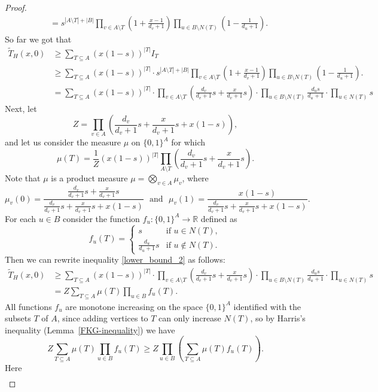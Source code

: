 \documentclass[12pt,a4paper]{amsart}
\numberwithin{equation}{section}
\theoremstyle{plain}
\theoremstyle{definition}
\newcommand{\1}{\textbf{1}}
\begin{document}
\begin{proof}
\begin{align*}
&=s^{|A\setminus T|+|B|}\prod_{v \in A\setminus T}\left(1+\frac{x-1}{d_v+1}\right)\prod_{u\in B\setminus N(T)}\left(1-\frac{1}{d_u+1}\right).
\end{align*}
So far we got that
\begin{align} 
\widetilde{T}_H(x,0)&\geqslant \sum_{T\subseteq A}(x(1-s))^{|T|}I_T \nonumber\\
&\geqslant \sum_{T\subseteq A}(x(1-s))^{|T|}\cdot s^{|A\setminus T|+|B|}\prod_{v \in A\setminus T}\left(1+\frac{x-1}{d_v+1}\right)\prod_{u\in B\setminus N(T)}\left(1-\frac{1}{d_u+1}\right). \nonumber\\
&= \sum_{T\subseteq A}(x(1-s))^{|T|}\cdot \prod_{v\in A\setminus T}\left(\frac{d_v}{d_v+1}s+\frac{x}{d_v+1}s\right)\cdot  \prod_{u\in B\setminus N(T)} \frac{d_us}{d_u+1}\cdot \prod_{u\in N(T)}s \label{lower_bound_2}
\end{align}
Next, let 
$$Z=\prod_{v\in A}\left(\frac{d_v}{d_v+1}s+\frac{x}{d_v+1}s+x(1-s)\right),$$
and let us consider the measure $\mu$ on $\{0,1\}^A$ for which
$$\mu(T)=\frac{1}{Z}(x(1-s))^{|T|}\prod_{A\setminus T}\left(\frac{d_v}{d_v+1}s+\frac{x}{d_v+1}s\right).$$
Note that $\mu$ is a product measure $\mu=\bigotimes_{v\in A} \mu_v$, where
$$\mu_v(0)=\frac{\frac{d_v}{d_v+1}s+\frac{x}{d_v+1}s}{\frac{d_v}{d_v+1}s+\frac{x}{d_v+1}s+x(1-s)}\ \ \ \text{and}\ \ \ \mu_v(1)=\frac{x(1-s)}{\frac{d_v}{d_v+1}s+\frac{x}{d_v+1}s+x(1-s)}.$$
For each $u\in B$ consider the function $f_u: \{0,1\}^A\to \mathbb{R}$ defined as
$$f_u(T)=\begin{cases} s & \text{if } u\in N(T), \\
\frac{d_u}{d_u+1}s  & \text{if } u\not\in N(T).
\end{cases}$$
Then we can rewrite inequality \eqref{lower_bound_2} as follows:
\begin{align*}
\widetilde{T}_H(x,0)&\geqslant \sum_{T\subseteq A}(x(1-s))^{|T|}\cdot \prod_{v\in A\setminus T}\left(\frac{d_v}{d_v+1}s+\frac{x}{d_v+1}s\right)\cdot  \prod_{u\in B\setminus N(T)} \frac{d_us}{d_u+1}\cdot \prod_{u\in N(T)}s\\
&=Z\sum_{T\subseteq A}\mu(T)\prod_{u\in B}f_u(T).
\end{align*}
All functions $f_u$ are monotone increasing on the space $\{0,1\}^{A}$ identified  with the subsets  $T$ of $A$,  since adding vertices to $T$ can only increase $N(T)$, so by Harris's inequality (Lemma~\ref{FKG-inequality}) we have
$$Z\sum_{T\subseteq A}\mu(T)\prod_{u\in B}f_u(T)\geqslant Z\prod_{u\in B}\left(\sum_{T\subseteq A}\mu(T)f_u(T)\right).$$
Here
\begin{align*}

\end{align*}
\end{proof}
\end{document}
